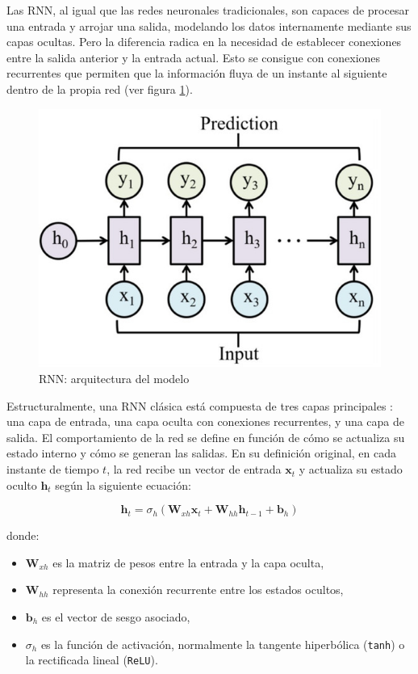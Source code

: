 Las RNN, al igual que las redes neuronales tradicionales, son capaces de procesar una entrada y arrojar una salida, modelando los datos internamente mediante sus capas ocultas. Pero la diferencia radica en la necesidad de establecer conexiones entre la salida anterior y la entrada actual. Esto se consigue con conexiones recurrentes que permiten que la información fluya de un instante al siguiente dentro de la propia red (ver figura \ref{rnn}).

\begin{figure}[H] %
    \centering
    \includegraphics[scale=0.4]{img/rnn}
    \caption{RNN: arquitectura del modelo \cite{info15090517}}
    \label{rnn}
\end{figure}

Estructuralmente, una RNN clásica está compuesta de tres capas principales \cite{info15090517}: una capa de entrada, una capa oculta con conexiones recurrentes, y una capa de salida. El comportamiento de la red se define en función de cómo se actualiza su estado interno y cómo se generan las salidas. En su definición original, en cada instante de tiempo \( t \), la red recibe un vector de entrada \( \mathbf{x}_t \) y actualiza su estado oculto \( \mathbf{h}_t \) según la siguiente ecuación:

\begin{equation}
    \mathbf{h}_t = \sigma_h(\mathbf{W}_{xh} \mathbf{x}_t + \mathbf{W}_{hh} \mathbf{h}_{t-1} + \mathbf{b}_h)
\end{equation}

donde:
\begin{itemize}
    \item \( \mathbf{W}_{xh} \) es la matriz de pesos entre la entrada y la capa oculta,
    \item \( \mathbf{W}_{hh} \) representa la conexión recurrente entre los estados ocultos,
    \item \( \mathbf{b}_h \) es el vector de sesgo asociado,
    \item \textbf{\( \sigma_h \)} es la función de activación, normalmente la tangente hiperbólica (\texttt{tanh}) o la rectificada lineal (\texttt{ReLU}).
\end{itemize}

